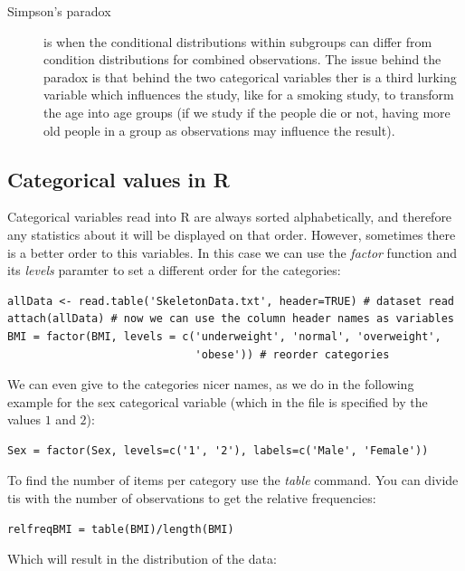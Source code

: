 \begin{description}
	\item[Simpson's paradox] is when the conditional distributions within
	      subgroups can differ from condition distributions for combined observations.
	      The issue behind the paradox is that behind the two categorical variables ther
	      is a third lurking variable which influences the study, like for a smoking
	      study, to transform the age into age groups (if we study if the people die
	      or not, having more old people in a group as observations may influence the
	      result).
\end{description}
\subsection{Categorical values in R}

Categorical variables read into R are always sorted alphabetically, and
therefore any statistics about it will be displayed on that order. However,
sometimes there is a better order to this variables. In this case we can use the
\emph{factor} function and its \emph{levels} paramter to set a different order
for the categories:

\begin{verbatim}
allData <- read.table('SkeletonData.txt', header=TRUE) # dataset read
attach(allData) # now we can use the column header names as variables
BMI = factor(BMI, levels = c('underweight', 'normal', 'overweight',
                             'obese')) # reorder categories
\end{verbatim}

We can even give to the categories nicer names, as we do in the following
example for the sex categorical variable (which in the file is specified by the
values $1$ and $2$):

\begin{verbatim}
Sex = factor(Sex, levels=c('1', '2'), labels=c('Male', 'Female'))
\end{verbatim}

To find the number of items per category use the \emph{table} command. You can
divide tis with the number of observations to get the relative frequencies:

\begin{verbatim}
relfreqBMI = table(BMI)/length(BMI)
\end{verbatim}

Which will result in the distribution of the data:

